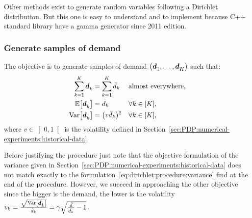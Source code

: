 Other methods exist to generate random variables following a Dirichlet distribution. But this one is easy to understand and to implement because C++ standard library have a gamma generator since 2011 edition.




\subsubsection{Generate samples of demand}

The objective is to generate samples of demand $\bracket{\va\demand_1,\ldots,\va\demand_K}$ such that:
\begin{subequations}
  \begin{align}
    \sum_{k=1}^K \va\demand_k &= \sum_{k=1}^K \bar{\demand}_k && \mbox{almost everywhere},
    \\
    \espe\sqbracket{\va\demand_k} &= \bar{\demand}_k && \forall k\in\range{K},
    \\
    \vari\sqbracket{\va\demand_k} &= \bracket{v\bar{\demand}_k}^2 && \forall k\in\range{K},
  \end{align}
\end{subequations}
where $v\in\left]0,1\right[$ is the volatility defined in Section~\ref{sec:PDP:numerical-experiments:historical-data}.


\medskip

Before justifying the procedure just note that the objective formulation of the variance given in Section~\ref{sec:PDP:numerical-experiments:historical-data} does not match exactly to the formulation~\eqref{eq:dirichlet:procedure:variance} find at the end of the procedure. However, we succeed in approaching the other objective since the bigger is the demand, the lower is the volatility $v_k=\frac{\sqrt{\vari\sqbracket{\va\demand_k}}}{\bar{\demand}_k} = \gamma\sqrt{\frac{\bar{\demand}}{\bar{\demand_k}}-1}$.


\medskip


